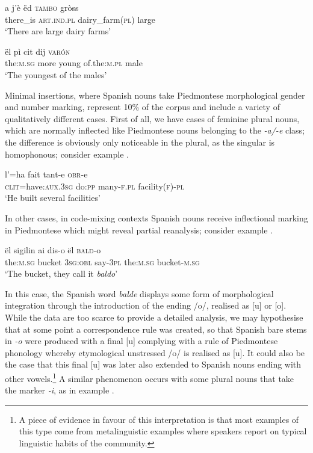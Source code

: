 \documentclass[output=paper]{langscibook}
\begin{document}
\ea%
    \label{ex:goria:8}
    \gll a j'è ëd \textsc{tambo} gròss\\
         there\_is \textsc{art}.\textsc{ind}.\textsc{pl} dairy\_farm(\textsc{pl}) large\\
    \glt ‘There are large dairy farms’
\z %

\ea%
    \label{ex:goria:9}
    \gll ël pì cit dij \textsc{varón}\\
         the:\textsc{m}.\textsc{sg} more young of.the:\textsc{m}.\textsc{pl} male\\
    \glt ‘The youngest of the males’
\z %

Minimal insertions, where Spanish nouns take Piedmontese morphological gender and number marking, represent 10\% of the corpus and include a variety of qualitatively different cases. First of all, we have cases of feminine plural nouns, which are normally inflected like Piedmontese nouns belonging to the \textit{{}-a/-e} class; the difference is obviously only noticeable in the plural, as the singular is homophonous; consider example .

\ea%
    \label{ex:goria:10}
    \gll l’=ha fait tant-e \textsc{obr}{}-e\\
         \textsc{clit}=have:\textsc{aux}.\textsc{3sg} do:\textsc{pp} many-\textsc{f.pl} facility(\textsc{f})-\textsc{pl}\\
    \glt ‘He built several facilities’
\z %

In other cases, in code-mixing contexts Spanish nouns receive inflectional marking in Piedmontese which might reveal partial reanalysis; consider example .

\ea%
    \label{ex:goria:11}
    \gll ël sigilin ai dis-o ël \textsc{bald}{}-o\\
         the:\textsc{m.sg} bucket \textsc{3sg}:\textsc{obl} say-\textsc{3pl} the:\textsc{m.sg} bucket-\textsc{m}.\textsc{sg}\\
    \glt ‘The bucket, they call it \textit{baldo}’
\z %

In this case, the Spanish word \textit{balde} displays some form of morphological integration through the introduction of the ending /o/, realised as [u] or [o]. While the data are too scarce to provide a detailed analysis, we may hypothesise that at some point a correspondence rule \citep{Thomason2007} was created, so that Spanish bare stems in \textit{{}-o} were produced with a final [u] complying with a rule of Piedmontese phonology whereby etymological unstressed /o/ is realised as [u]. It could also be the case that this final [u] was later also extended to Spanish nouns ending with other vowels.\footnote{A piece of evidence in favour of this interpretation is that most examples of this type come from metalinguistic examples where speakers report on typical linguistic habits of the community.} A similar phenomenon occurs with some plural nouns that take the marker \textit{{}-i}, as in example .
\end{document}
